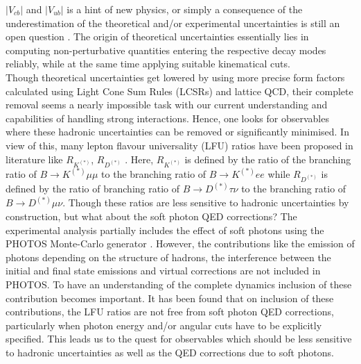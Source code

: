 \documentclass[a4paper,11pt]{article}
\begin{document}
	 $|V_{cb}|$ and $|V_{ub}|$ is a hint of new physics, or simply a consequence of the underestimation of the theoretical 
	 and/or experimental uncertainties is still an open question \cite{Ricciardi:2021shl,Faller:2011nj,
	 Crivellin:2014zpa,Bigi:2015uba,Colangelo:2016ymy,Bigi:2017njr,Gambino:2019sif,Akeroyd:2003zr,Chen:2008se,
	 Crivellin:2012ye,Crivellin:2009sd,Buras:2013ooa}. The origin of theoretical uncertainties essentially lies in computing non-perturbative 
	 quantities entering the respective decay modes reliably, while at the same time applying suitable kinematical cuts.\\
	Though theoretical uncertainties get lowered by using more precise form factors calculated using Light Cone Sum Rules (LCSRs) and 
	lattice QCD, their complete removal seems a nearly impossible task with our current understanding and capabilities of handling strong interactions. 
	Hence, one looks for observables where these hadronic uncertainties can be removed or significantly minimised. In view of this, 
	many lepton flavour universality (LFU) ratios have been proposed in literature like $R_{K^{(*)}}$, $R_{D^{(*)}}$
	\cite{Hiller:2003js,Chen:2006nua,Bhattacharya:2014wla,Bordone:2016gaq,Bobeth:2007dw,Hiller:2014yaa,Fajfer:2012vx,Kamenik:2008tj}. Here,  $R_{K^{(*)}}$ is defined by the 
	ratio of the branching ratio of $B\to K^{(*)} \mu \mu$ to the branching ratio of $B\to K^{(*)} e e$ while $R_{D^{(*)}}$ is 
	defined by the ratio of branching ratio of $B\to D^{(*)} \tau \nu$ to the branching ratio of $B\to D^{(*)} \mu \nu$. 
	Though these ratios are less sensitive to hadronic uncertainties by construction, but what about the soft photon QED corrections? The experimental analysis partially includes the effect of soft photons using the PHOTOS Monte-Carlo generator 
	\cite{Barberio:1993qi,Golonka:2005pn,Davidson:2010ew}. However, the contributions
	like the emission of photons depending on the structure of hadrons, the interference between the initial and final 
	state emissions and virtual corrections are not included in PHOTOS. To have an understanding of the complete dynamics 
	inclusion of these contribution becomes important. It has been found that on inclusion of these contributions, 
	the LFU ratios are not 
	free from soft photon QED corrections\cite{Misiak:2010zz,Bernlochner:2010yd,Becirevic:2012jf,deBoer:2018ipi,Cali:2019nwp,
	Isidori:2020acz,Mishra:2020orb}, 
	particularly when photon energy and/or angular cuts have to be explicitly specified. This leads us to the quest for	
	observables which should be less sensitive to hadronic uncertainties as well as the QED corrections due to soft photons.\\
\end{document}
